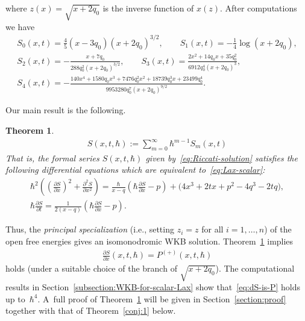 \documentclass[11pt]{article}
\newtheorem{thm}{Theorem}[section]
\theoremstyle{definition}
\numberwithin{equation}{section}
\def\p{\partial}
\begin{document}
where $z(x) = \sqrt{x+2q_{0}}$ is the inverse function of $x(z)$.
After computations we have
\begin{gather*}
S_{0}(x,t)  =  \frac{4}{5}(x-3q_{0})(x+2q_{0})^{3/2}, \qquad
S_{1}(x,t)  =  - \frac{1}{4}\log(x+2q_{0}), \\
S_{2}(x,t)  =  -\frac{x+7q_{0}}{288q_{0}^{2}(x+2q_{0})^{3/2}}, \qquad
S_{3}(x,t)  =  \frac{2x^{2}+14q_{0}x+35q_{0}^{2}}
{6912q_{0}^{4}(x+2q_{0})^{3}}, \\
S_{4}(x,t)  =  -\frac{140x^{4}+1580q_{0}x^{3}
+ 7476 q_{0}^{2}x^{2}+18739q_{0}^{3}x+23499q_{0}^{4}}
{9953280 q_{0}^{7}(x+2q_{0})^{9/2}}.
\end{gather*}

Our main result is the following.

\begin{thm} \label{conj:2}
\setcounter{section}{3}
\setcounter{subsection}{2}
\setcounter{subsubsection}{0}
\setcounter{thm}{3}
\setcounter{equation}{3}
\setcounter{equation}{4}
\begin{gather}
S(x,t,\hbar)   :=   \sum_{m = 0}^{\infty} \hbar^{m-1} S_{m}(x,t)
\label{eq:Riccati-solution}
\end{gather}
\setcounter{section}{3}
\setcounter{subsection}{2}
\setcounter{subsubsection}{0}
\setcounter{thm}{3}
\setcounter{equation}{5}
That is, the formal series $S(x,t,\hbar)$ given by~\eqref{eq:Riccati-solution} satisfies
the following differential equations which are equivalent to~\eqref{eq:Lax-scalar}:
\begin{gather}  \label{eq:Riccati-2}
 \hbar^{2}\left( \left(\frac{\p S}{\p x}\right)^{2} +
\frac{\p^{2} S}{\p x^{2}} \right)   =
\frac{\hbar}{x-q} \left( \hbar \frac{\p S}{\p x} - p \right)
+ \big(4x^{3}+2t x + p^{2} - 4q^{3}-2tq\big),   \\
\label{eq:dt-Riccati-2}
 \hbar\frac{\p S}{\p t}   =   \frac{1}{2(x-q)} \left(
\hbar \frac{\p S}{\p x} - p \right).
\end{gather}
\end{thm}

Thus, the {\em principal specialization}
(i.e., setting $z_{i} = z$ for all $i = 1,\dots,n$)
of the open free energies gives an isomonodromic WKB solution.
Theorem~\ref{conj:2} implies
\begin{gather} \label{eq:dS-is-P}
\frac{\p S}{\p x}(x,t,\hbar) = P^{(+)}(x,t,\hbar)
\end{gather}
holds (under a suitable choice of the branch of $\sqrt{x+2q_{0}}$).
The computational results in Section~\ref{subsection:WKB-for-scalar-Lax}
show that~\eqref{eq:dS-is-P}
holds up to~$\hbar^{4}$. A~full proof of Theorem~\ref{conj:2}
will be given in Section~\ref{section:proof} together
with that of Theorem~\ref{conj:1} below.
\end{document}
